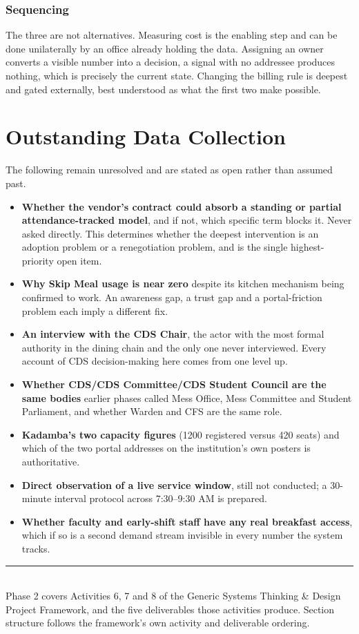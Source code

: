 \documentclass[11pt]{article}
\begin{document}
\subsubsection*{Sequencing}

The three are not alternatives. Measuring cost is the enabling step and can be done unilaterally by
an office already holding the data. Assigning an owner converts a visible number into a decision,
a signal with no addressee produces nothing, which is precisely the current state. Changing the
billing rule is deepest and gated externally, best understood as what the first two make possible.

\newpage
\section{Outstanding Data Collection}

The following remain unresolved and are stated as open rather than assumed past.

\begin{itemize}[leftmargin=*]
\item \textbf{Whether the vendor's contract could absorb a standing or partial attendance-tracked
model}, and if not, which specific term blocks it. Never asked directly. This determines whether
the deepest intervention is an adoption problem or a renegotiation problem, and is the single
highest-priority open item.
\item \textbf{Why Skip Meal usage is near zero} despite its kitchen mechanism being confirmed to
work. An awareness gap, a trust gap and a portal-friction problem each imply a different fix.
\item \textbf{An interview with the CDS Chair}, the actor with the most formal authority in the
dining chain and the only one never interviewed. Every account of CDS decision-making here comes
from one level up.
\item \textbf{Whether CDS/CDS Committee/CDS Student Council are the same bodies} earlier phases
called Mess Office, Mess Committee and Student Parliament, and whether Warden and CFS are the same
role.
\item \textbf{Kadamba's two capacity figures} (1200 registered versus 420 seats) and which of the
two portal addresses on the institution's own posters is authoritative.
\item \textbf{Direct observation of a live service window}, still not conducted; a 30-minute
interval protocol across 7:30--9:30 AM is prepared.
\item \textbf{Whether faculty and early-shift staff have any real breakfast access}, which if so is
a second demand stream invisible in every number the system tracks.
\end{itemize}

\vspace{1em}
\noindent\rule{\textwidth}{0.4pt}\\[4pt]
\small Phase 2 covers Activities 6, 7 and 8 of the Generic Systems Thinking \& Design Project
Framework, and the five deliverables those activities produce. Section structure follows the
framework's own activity and deliverable ordering.
\end{document}
